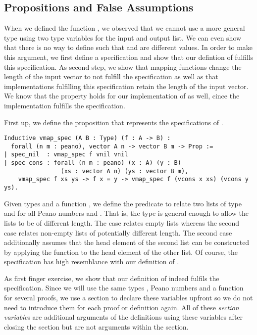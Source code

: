 \subsection{Propositions and False Assumptions}

When we defined the function , we observed that we cannot use a more general type using two type variables  for the input and output list.
We can even show that there is no way to define  such that  and  are different values.
In order to make this argument, we first define a specification and show that our defintion of  fulfills this specification.
As second step, we show that mapping functions change the length of the input vector to not fulfill the specification as well as that implementations fulfilling this specification retain the length of the input vector.
We know that the property holds for our implementation of  as well, cince the implementation fulfills the specification.

First up, we define the proposition  that represents the specifications of .

\begin{verbatim}
Inductive vmap_spec (A B : Type) (f : A -> B) :
  forall (n m : peano), vector A n -> vector B m -> Prop :=
| spec_nil  : vmap_spec f vnil vnil
| spec_cons : forall (n m : peano) (x : A) (y : B)
                (xs : vector A n) (ys : vector B m),
    vmap_spec f xs ys -> f x = y -> vmap_spec f (vcons x xs) (vcons y ys).
\end{verbatim}

Given types  and a function , we define the predicate to relate two lists of type  and  for all Peano numbers  and .
That is, the type is general enough to allow the lists to be of different length.
The  case relates empty lists whereas the second case  relates non-empty lists of potentially different length.
The second case additionally assumes that the head element of the second list  can be constructed by applying the function to the head element  of the other list.
Of course, the specification has high resemblance with our definition of .

As first finger exercise, we show that our definition of  indeed fulfils the specification.
Since we will use the same types , Peano numbers  and a function  for several proofs, we use a section to declare these variables upfront so we do not need to introduce them for each proof or definition again.
All of these \emph{section variable}s are additional arguments of the definitions using these variables after closing the section but are not arguments within the section.

